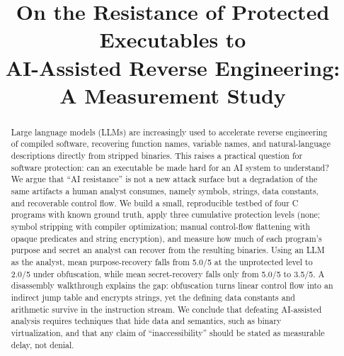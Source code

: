 \documentclass[conference]{IEEEtran}
\begin{document}
\title{On the Resistance of Protected Executables to\\
AI-Assisted Reverse Engineering:\\
A Measurement Study}

\author{
\and
{}
}

\maketitle

\begin{abstract}
Large language models (LLMs) are increasingly used to accelerate reverse
engineering of compiled software, recovering function names, variable names,
and natural-language descriptions directly from stripped binaries. This raises
a practical question for software protection: can an executable be made hard
for an AI system to understand? We argue that ``AI resistance'' is not a new
attack surface but a degradation of the same artifacts a human analyst
consumes, namely symbols, strings, data constants, and recoverable control
flow. We build a small, reproducible testbed of four C programs with known
ground truth, apply three cumulative protection levels (none; symbol stripping
with compiler optimization; manual control-flow flattening with opaque
predicates and string encryption), and measure how much of each program's
purpose and secret an analyst can recover from the resulting binaries. Using an
LLM as the analyst, mean purpose-recovery falls from 5.0/5 at the unprotected
level to 2.0/5 under obfuscation, while mean secret-recovery falls only from
5.0/5 to 3.5/5. A disassembly walkthrough explains the gap: obfuscation turns
linear control flow into an indirect jump table and encrypts strings, yet the
defining data constants and arithmetic survive in the instruction stream. We
conclude that defeating AI-assisted analysis requires techniques that hide data
and semantics, such as binary virtualization, and that any claim of
``inaccessibility'' should be stated as measurable delay, not denial.
\end{abstract}
\end{document}
